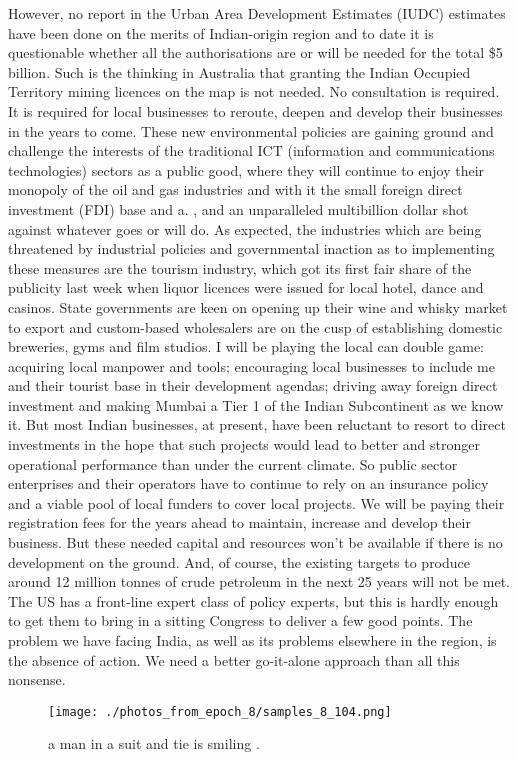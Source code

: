 \documentclass{article}%
\begin{document}
However, no report in the Urban Area Development Estimates (IUDC) estimates have been done on the merits of Indian{-}origin region and to date it is questionable whether all the authorisations are or will be needed for the total \$5 billion. Such is the thinking in Australia that granting the Indian Occupied Territory mining licences on the map is not needed. No consultation is required. It is required for local businesses to reroute, deepen and develop their businesses in the years to come.\newline%
These new environmental policies are gaining ground and challenge the interests of the traditional ICT (information and communications technologies) sectors as a public good, where they will continue to enjoy their monopoly of the oil and gas industries and with it the small foreign direct investment (FDI) base and a. , and an unparalleled multibillion dollar shot against whatever goes or will do.\newline%
As expected, the industries which are being threatened by industrial policies and governmental inaction as to implementing these measures are the tourism industry, which got its first fair share of the publicity last week when liquor licences were issued for local hotel, dance and casinos. State governments are keen on opening up their wine and whisky market to export and custom{-}based wholesalers are on the cusp of establishing domestic breweries, gyms and film studios.\newline%
I will be playing the local can double game: acquiring local manpower and tools; encouraging local businesses to include me and their tourist base in their development agendas; driving away foreign direct investment and making Mumbai a Tier 1 of the Indian Subcontinent as we know it.\newline%
But most Indian businesses, at present, have been reluctant to resort to direct investments in the hope that such projects would lead to better and stronger operational performance than under the current climate. So public sector enterprises and their operators have to continue to rely on an insurance policy and a viable pool of local funders to cover local projects.\newline%
We will be paying their registration fees for the years ahead to maintain, increase and develop their business. But these needed capital and resources won't be available if there is no development on the ground. And, of course, the existing targets to produce around 12 million tonnes of crude petroleum in the next 25 years will not be met.\newline%
The US has a front{-}line expert class of policy experts, but this is hardly enough to get them to bring in a sitting Congress to deliver a few good points. The problem we have facing India, as well as its problems elsewhere in the region, is the absence of action. We need a better go{-}it{-}alone approach than all this nonsense.\newline%

%


\begin{figure}[h!]%
\centering%
\texttt{[image: ./photos\_from\_epoch\_8/samples\_8\_104.png]}%
\caption{a man in a suit and tie is smiling .}%
\end{figure}

%
\end{document}
